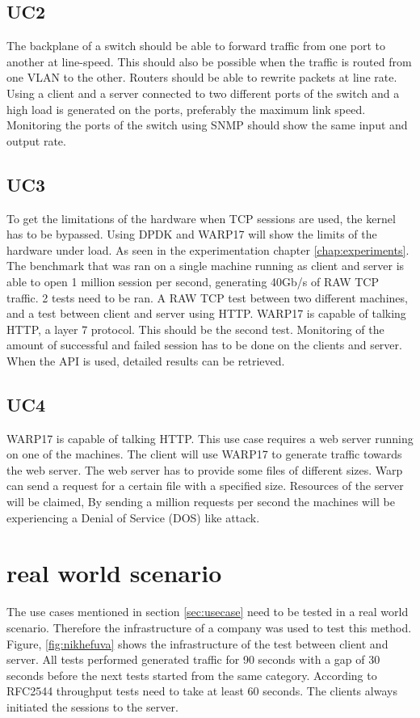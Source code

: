 \subsection{UC2}
The backplane of a switch should be able to forward traffic from one port to another at line-speed. This should also be possible when the traffic is routed from one VLAN to the other. Routers should be able to rewrite packets at line rate. Using a client and a server connected to two different ports of the switch and a high load is generated on the ports, preferably the maximum link speed. Monitoring the ports of the switch using SNMP should show the same input and output rate.    

\subsection{UC3}
To get the limitations of the hardware when TCP sessions are used, the kernel has to be bypassed. Using DPDK and WARP17 will show the limits of the hardware under load. As seen in the experimentation chapter \ref{chap:experiments}. The benchmark that was ran on a single machine running as client and server is able to open 1 million session per second, generating 40Gb/s of RAW TCP traffic. 2 tests need to be ran. A RAW TCP test between two different machines, and a test between client and server using HTTP. WARP17 is capable of talking HTTP, a layer 7 protocol. This should be the second test. Monitoring of the amount of successful and failed session has to be done on the clients and server. When the API is used, detailed results can be retrieved.   

\subsection{UC4}
WARP17 is capable of talking HTTP. This use case requires a web server running on one of the machines. The client will use WARP17 to generate traffic towards the web server. The web server has to provide some files of different sizes. Warp can send a request for a certain file with a specified size. Resources of the server will be claimed, By sending a million requests per second the machines will be experiencing a Denial of Service (DOS) like attack.


\section{real world scenario}
The use cases mentioned in section \ref{sec:usecase} need to be tested in a real world scenario. Therefore the infrastructure of a company was used to test this method.
Figure, \ref{fig:nikhefuva} shows the infrastructure of the test between client and server. All tests performed generated traffic for 90 seconds with a gap of 30 seconds before the next tests started from the same category. According to RFC2544 \cite{rfc2544} throughput tests need to take at least 60 seconds. The clients always initiated the sessions to the server.

